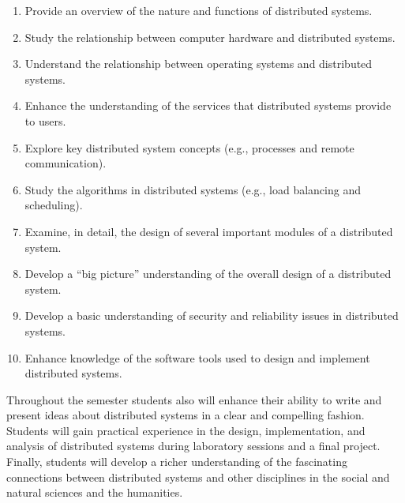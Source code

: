 \begin{enumerate}

  \itemsep 0in

  \item Provide an overview of the nature and functions of distributed systems.

  \item Study the relationship between computer hardware and distributed systems.

  \item Understand the relationship between operating systems and distributed systems.

  \item Enhance the understanding of the services that distributed systems provide to users.

  \item Explore key distributed system concepts (e.g., processes and remote communication).

  \item Study the algorithms in distributed systems (e.g., load balancing and scheduling).

  \item Examine, in detail, the design of several important modules of a distributed system.

  \item Develop a ``big picture'' understanding of the overall design of a distributed system.

  \item Develop a basic understanding of security and reliability issues in distributed systems.

  \item Enhance knowledge of the software tools used to design and implement distributed systems.

\end{enumerate}

\vspace*{-.075in}

\noindent Throughout the semester students also will enhance their ability to write and present ideas about distributed
systems in a clear and compelling fashion.  Students will gain practical experience in the design, implementation, and
analysis of distributed systems during laboratory sessions and a final project. Finally, students will develop a richer
understanding of the fascinating connections between distributed systems and other disciplines in the social and natural
sciences and the humanities.

